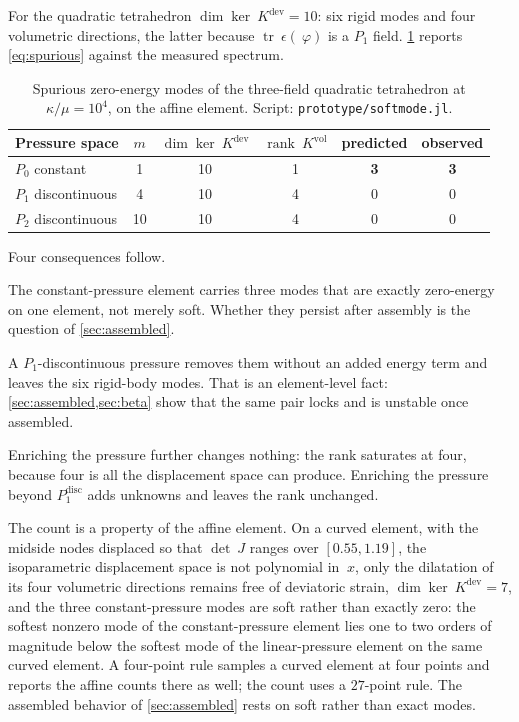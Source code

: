 \documentclass{article}
\newcommand{\eps}{~\epsilon}
\newcommand{\disp}{~\varphi}
\newcommand{\bx}{~x}
\newcommand{\trace}{\operatorname{tr}}
\newcommand{\supvol}{^{\mathrm{vol}}}
\newcommand{\supdev}{^{\mathrm{dev}}}
\newcommand{\code}[1]{\texttt{#1}}
\theoremstyle{definition}
\theoremstyle{plain}
\begin{document}
For the quadratic tetrahedron $\dim\ker ~K\supdev = 10$: six rigid modes and
four volumetric directions, the latter because $\trace\eps(\disp)$ is a $P_1$
field. \cref{tab:count} reports \eqref{eq:spurious} against the measured
spectrum.

\begin{table}[h]
\centering
\begin{tabular}{@{}lccccc@{}}
\toprule
Pressure space & $m$ & $\dim\ker ~K\supdev$ & $\operatorname{rank} ~K\supvol$ & predicted & observed \\
\midrule
$P_0$ constant            & 1  & 10 & 1 & \textbf{3} & \textbf{3} \\
$P_1$ discontinuous       & 4  & 10 & 4 & 0 & 0 \\
$P_2$ discontinuous       & 10 & 10 & 4 & 0 & 0 \\
\bottomrule
\end{tabular}
\caption{Spurious zero-energy modes of the three-field quadratic tetrahedron at
$\kappa/\mu = 10^4$, on the affine element. Script:
\code{prototype/softmode.jl}.}
\label{tab:count}
\end{table}

Four consequences follow.

The constant-pressure element carries three modes that are exactly
zero-energy on one element, not merely soft. Whether they persist after assembly is
the question of \cref{sec:assembled}.

A $P_1$-discontinuous pressure removes them without an added energy term and
leaves the six rigid-body modes. That is an element-level fact:
\cref{sec:assembled,sec:beta} show that the same pair locks and
is unstable once assembled.

Enriching the pressure further changes nothing: the rank saturates at four,
because four is all the displacement space can produce. Enriching the
pressure beyond $P_1^{\mathrm{disc}}$ adds unknowns and leaves the rank
unchanged.

The count is a property of the affine element. On a curved element, with the
midside nodes displaced so that $\det ~J$ ranges over $[0.55, 1.19]$, the
isoparametric displacement space is not polynomial in $\bx$, only the
dilatation of its four volumetric directions remains free of deviatoric
strain, $\dim\ker ~K\supdev = 7$, and the three constant-pressure modes are
soft rather than exactly zero: the softest nonzero mode of the
constant-pressure element lies one to two orders of magnitude below the
softest mode of the linear-pressure element on the same curved element. A
four-point rule samples a curved element at four points and reports the
affine counts there as well; the count uses a $27$-point rule. The assembled
behavior of \cref{sec:assembled} rests on soft rather than exact modes.
\end{document}
